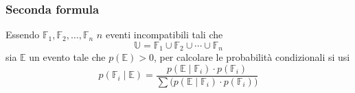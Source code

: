 \subsubsection{Seconda formula}
Essendo $\mathbb{F}_1, \mathbb{F}_2,\dotsc,\mathbb{F}_n$ $n$ eventi incompatibili tali che
\begin{equation*}
\mathbb{U} = \mathbb{F}_1\cup\mathbb{F}_2\cup\dotsb\cup\mathbb{F}_n
\end{equation*}
sia $\mathbb{E}$ un evento tale che $p(\mathbb{E})>0$, per calcolare le probabilità condizionali si
usi
\begin{equation*}
p\left(\mathbb{F}_i\mid\mathbb{E}\right) =
\frac{p\left(\mathbb{E}\mid\mathbb{F}_i\right)\cdot p(\mathbb{F}_i)}
{\sum\big(p\left(\mathbb{E}\mid\mathbb{F}_i\right)\cdot p(\mathbb{F}_i)\big)}
\end{equation*}

